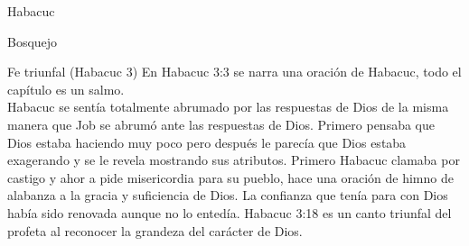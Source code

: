 \begin{section}{Habacuc}
\begin{subsection}{Bosquejo}
\begin{subsubsection}{Fe triunfal (Habacuc 3)}
			En Habacuc 3:3 se narra una oración de Habacuc, todo el capítulo es un salmo. \\
			Habacuc se sentía totalmente abrumado por las respuestas de Dios de la misma manera que Job se abrumó ante las respuestas de Dios. Primero pensaba que Dios estaba haciendo muy poco pero después le parecía que Dios estaba exagerando y se le revela mostrando sus atributos. Primero Habacuc clamaba por castigo y ahor a pide misericordia para su pueblo, hace una oración de himno de alabanza a la gracia y suficiencia de Dios. La confianza que tenía para con Dios había sido renovada aunque no lo entedía. Habacuc 3:18 es un canto triunfal del profeta al reconocer la grandeza del carácter de Dios.
		\end{subsubsection}
	\end{subsection}
\end{section}
%


